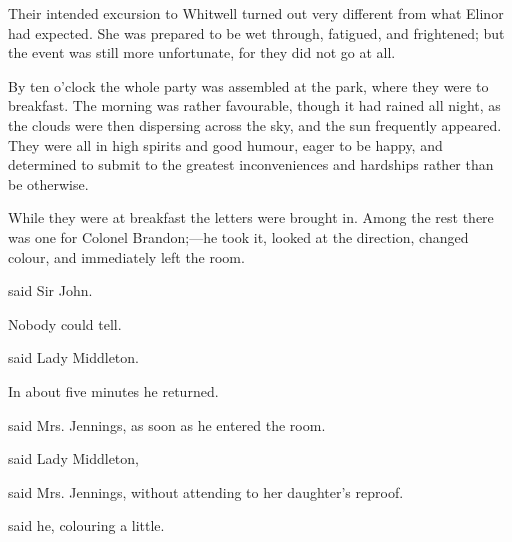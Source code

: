 Their intended excursion to Whitwell turned out very different from what Elinor had expected. She was prepared to be wet through, fatigued, and frightened; but the event was still more unfortunate, for they did not go at all.

By ten o'clock the whole party was assembled at the park, where they were to breakfast. The morning was rather favourable, though it had rained all night, as the clouds were then dispersing across the sky, and the sun frequently appeared. They were all in high spirits and good humour, eager to be happy, and determined to submit to the greatest inconveniences and hardships rather than be otherwise.

While they were at breakfast the letters were brought in. Among the rest there was one for Colonel Brandon;---he took it, looked at the direction, changed colour, and immediately left the room.

 said Sir John.

Nobody could tell.

 said Lady Middleton. 

In about five minutes he returned.

 said Mrs. Jennings, as soon as he entered the room.





 said Lady Middleton, 

 said Mrs. Jennings, without attending to her daughter's reproof.



 said he, colouring a little.

